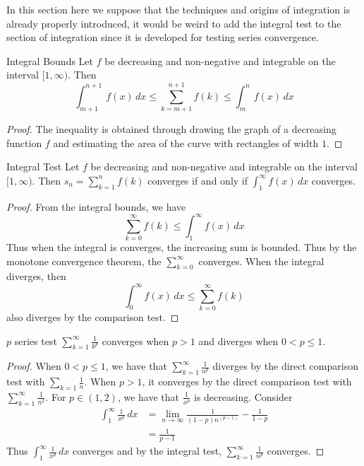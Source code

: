 In this section here we suppose that the techniques and origins of integration is already properly introduced, it would be weird to add the integral test to the section of integration since it is developed for testing series convergence. 
\begin{thm}{Integral Bounds}{} Let $f$ be decreasing and non-negative and integrable on the interval $[1,\infty)$. Then $$\int_{m+1}^{n+1}f(x)\,dx\leq\sum_{k=m+1}^{n+1}f(k)\leq\int_{m}^{n}f(x)\,dx$$ \tcbline
\begin{proof} The inequality is obtained through drawing the graph of a decreasing function $f$ and estimating the area of the curve with rectangles of width $1$. 
\end{proof}
\end{thm}

\begin{thm}{Integral Test}{} Let $f$ be decreasing and non-negative and integrable on the interval $[1,\infty)$. Then $s_n=\sum_{k=1}^{n}f(k)$ converges if and only if $\int_{1}^{\infty}f(x)\,dx$ converges. \tcbline
\begin{proof} From the integral bounds, we have $$\sum_{k=0}^{\infty}f(k)\leq\int_{1}^{\infty}f(x)\,dx$$ Thus when the integral is converges, the increasing sum is bounded. Thus by the monotone convergence theorem, the $\sum_{k=0}^{\infty}$ converges. When the integral diverges, then $$\int_{0}^{\infty}f(x)\,dx\leq\sum_{k=0}^{\infty}f(k)$$ also diverges by the comparison test. 
\end{proof}
\end{thm}

\begin{thm}{$p$ series test}{} $\sum_{k=1}^{\infty}\frac{1}{k^p}$ converges when $p>1$ and diverges when $0<p\leq1$. \tcbline
\begin{proof} When $0<p\leq1$, we have that $\sum_{k=1}^{\infty}\frac{1}{n^p}$ diverges by the direct comparison test with $\sum_{k=1}\frac{1}{n}$. When $p>1$, it converges by the direct comparison test with $\sum_{k=1}^{\infty}\frac{1}{n^2}$. For $p\in(1,2)$, we have that $\frac{1}{x^p}$ is decreasing. Consider 
\begin{align*}
\int_{1}^{\infty}\frac{1}{x^p}\,dx&=\lim_{n\to\infty}\frac{1}{(1-p)n^{(p-1)}}-\frac{1}{1-p}\\
&=\frac{1}{p-1}
\end{align*}Thus $\int_{1}^{\infty}\frac{1}{x^p}\,dx$ converges and by the integral test, $\sum_{k=1}^{\infty}\frac{1}{n^p}$ converges. 
\end{proof}
\end{thm}


